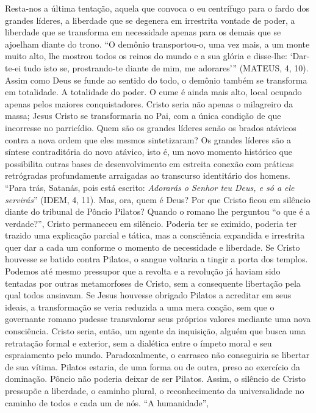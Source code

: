 Resta-nos a última tentação, aquela que convoca o eu centrífugo para o
fardo dos grandes líderes, a liberdade que se degenera em irrestrita
vontade de poder, a liberdade que se transforma em necessidade apenas
para os demais que se ajoelham diante do trono. ``O demônio
transportou-o, uma vez mais, a um monte muito alto, lhe mostrou todos os
reinos do mundo e a sua glória e disse-lhe: `Dar-te-ei tudo isto se,
prostrando-te diante de mim, me adorares''' (MATEUS, 4, 10). Assim como
Deus se funde ao sentido do todo, o demônio também se transforma em
totalidade. A totalidade do poder. O cume é ainda mais alto, local
ocupado apenas pelos maiores conquistadores. Cristo seria não apenas o
milagreiro da massa; Jesus Cristo se transformaria no Pai, com a única
condição de que incorresse no parricídio. Quem são os grandes líderes
senão os brados atávicos contra a nova ordem que eles mesmos
sintetizaram? Os grandes líderes são a síntese contraditória do novo
atávico, isto é, um novo momento histórico que possibilita outras bases
de desenvolvimento em estreita conexão com práticas retrógradas
profundamente arraigadas ao transcurso identitário dos homens. ``Para
trás, Satanás, pois está escrito: \emph{Adorarás o Senhor teu Deus, e só
a ele servirás}'' (IDEM, 4, 11). Mas, ora, quem é Deus? Por que Cristo
ficou em silêncio diante do tribunal de Pôncio Pilatos? Quando o romano
lhe perguntou ``o que é a verdade?'', Cristo permaneceu em silêncio.
Poderia ter se eximido, poderia ter trazido uma explicação parcial e
tática, mas a consciência expandida e irrestrita quer dar a cada um
conforme o momento de necessidade e liberdade. Se Cristo houvesse se
batido contra Pilatos, o sangue voltaria a tingir a porta dos templos.
Podemos até mesmo pressupor que a revolta e a revolução já haviam sido
tentadas por outras metamorfoses de Cristo, sem a consequente libertação
pela qual todos ansiavam. Se Jesus houvesse obrigado Pilatos a acreditar
em seus ideais, a transformação se veria reduzida a uma mera coação, sem
que o governante romano pudesse transvalorar seus próprios valores
mediante uma nova consciência. Cristo seria, então, um agente da
inquisição, alguém que busca uma retratação formal e exterior, sem a
dialética entre o ímpeto moral e seu espraiamento pelo mundo.
Paradoxalmente, o carrasco não conseguiria se libertar de sua vítima.
Pilatos estaria, de uma forma ou de outra, preso ao exercício da
dominação. Pôncio não poderia deixar de ser Pilatos. Assim, o silêncio
de Cristo pressupõe a liberdade, o caminho plural, o reconhecimento da
universalidade no caminho de todos e cada um de nós. ``A humanidade'',
